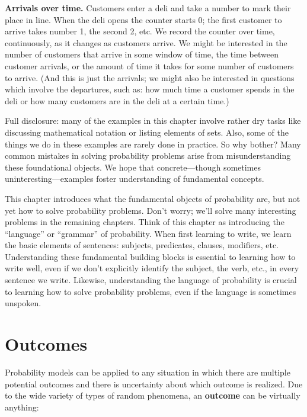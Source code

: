 \documentclass[
  letterpaper,
  DIV=11,
  numbers=noendperiod]{scrreprt}
\theoremstyle{plain}
\theoremstyle{definition}
\theoremstyle{definition}
\theoremstyle{definition}
\theoremstyle{remark}
\begin{document}
\textbf{Arrivals over time.} Customers enter a deli and take a number to
mark their place in line. When the deli opens the counter starts 0; the
first customer to arrive takes number 1, the second 2, etc. We record
the counter over time, continuously, as it changes as customers arrive.
We might be interested in the number of customers that arrive in some
window of time, the time between customer arrivals, or the amount of
time it takes for some number of customers to arrive. (And this is just
the arrivals; we might also be interested in questions which involve the
departures, such as: how much time a customer spends in the deli or how
many customers are in the deli at a certain time.)

Full disclosure: many of the examples in this chapter involve rather dry
tasks like discussing mathematical notation or listing elements of sets.
Also, some of the things we do in these examples are rarely done in
practice. So why bother? Many common mistakes in solving probability
problems arise from misunderstanding these foundational objects. We hope
that concrete---though sometimes uninteresting---examples foster
understanding of fundamental concepts.

This chapter introduces what the fundamental objects of probability are,
but not yet how to solve probability problems. Don't worry; we'll solve
many interesting problems in the remaining chapters. Think of this
chapter as introducing the ``language'' or ``grammar'' of probability.
When first learning to write, we learn the basic elements of sentences:
subjects, predicates, clauses, modifiers, etc. Understanding these
fundamental building blocks is essential to learning how to write well,
even if we don't explicitly identify the subject, the verb, etc., in
every sentence we write. Likewise, understanding the language of
probability is crucial to learning how to solve probability problems,
even if the language is sometimes unspoken.

\section{Outcomes}\label{sec-language-outcomes}

Probability models can be applied to any situation in which there are
multiple potential outcomes and there is uncertainty about which outcome
is realized. Due to the wide variety of types of random phenomena, an
\textbf{outcome} can be virtually anything:
\end{document}
